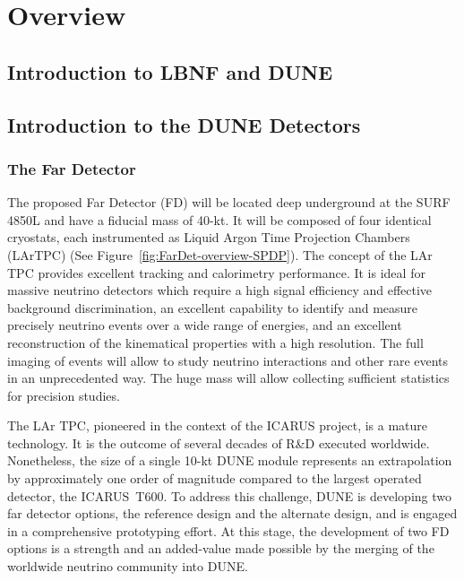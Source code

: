 \chapter{Overview}
\label{ch:detectors-overview}

\section{Introduction to LBNF and DUNE}


\section{Introduction to the DUNE Detectors}
\label{sec:intro-dune-det}

\subsection{The Far Detector}
\label{sec:intro-dune-far-det}

The proposed Far Detector (FD) will be located deep underground at the SURF 4850L and have
a  fiducial mass of 40-kt. It 
will be composed of four identical cryostats, each instrumented as Liquid Argon Time Projection Chambers (LArTPC)
(See Figure~\ref{fig:FarDet-overview-SPDP}). The concept of the LAr TPC provides
excellent tracking and calorimetry performance. It is ideal for massive neutrino detectors which require a high signal
efficiency and effective background discrimination,  an excellent capability to identify and measure
precisely neutrino events over a wide range of energies, and an excellent reconstruction of the kinematical properties
with a high resolution. The full imaging of events will allow to study neutrino interactions and
other rare events in an unprecedented way. The huge mass will allow collecting sufficient statistics for precision
studies.

The LAr TPC, pioneered in the context of the ICARUS project, is a mature technology. It is the outcome
of several decades of R\&D executed worldwide.  Nonetheless, the size of a single 10-kt DUNE module represents an extrapolation by approximately one order of magnitude compared to the largest operated detector, the ICARUS~T600. To address this challenge, DUNE is developing two far detector options, the reference design and the alternate design, and is engaged in a 
comprehensive prototyping effort. At this stage, the development of two FD options is a strength and an added-value 
made possible by the merging of the worldwide neutrino community into DUNE.

